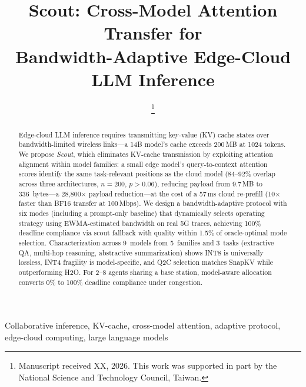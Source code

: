 \documentclass[journal]{IEEEtran}
\newcommand{\QtoC}{\textsc{Q2C}\xspace}
\begin{document}
\title{Scout: Cross-Model Attention Transfer for\\Bandwidth-Adaptive Edge-Cloud LLM Inference}

\author{
\thanks{Manuscript received XX, 2026. This work was supported in part by the National Science and Technology Council, Taiwan.}
}

\maketitle

\begin{abstract}
Edge-cloud LLM inference requires transmitting key-value (KV) cache states over bandwidth-limited wireless links---a 14B model's cache exceeds 200\,MB at 1024 tokens.
We propose \emph{Scout}, which eliminates KV-cache transmission by exploiting attention alignment within model families: a small edge model's query-to-context attention scores identify the same task-relevant positions as the cloud model (84--92\% overlap across three architectures, $n\!=\!200$, $p > 0.06$), reducing payload from 9.7\,MB to 336~bytes---a 28{,}800$\times$ payload reduction---at the cost of a 57\,ms cloud re-prefill (10$\times$ faster than BF16 transfer at 100\,Mbps).
We design a bandwidth-adaptive protocol with six modes (including a prompt-only baseline) that dynamically selects operating strategy using EWMA-estimated bandwidth on real 5G traces, achieving 100\% deadline compliance via scout fallback with quality within 1.5\% of oracle-optimal mode selection.
Characterization across 9~models from 5~families and 3~tasks (extractive QA, multi-hop reasoning, abstractive summarization) shows INT8 is universally lossless, INT4 fragility is model-specific, and \QtoC selection matches SnapKV while outperforming H2O.
For 2--8 agents sharing a base station, model-aware allocation converts 0\% to 100\% deadline compliance under congestion.
\end{abstract}

\begin{IEEEkeywords}
Collaborative inference, KV-cache, cross-model attention, adaptive protocol, edge-cloud computing, large language models
\end{IEEEkeywords}
\end{document}
